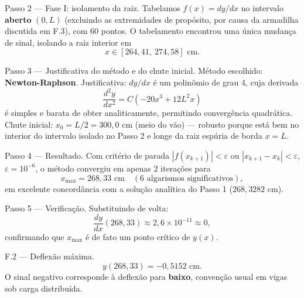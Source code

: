 \documentclass[
	12pt,				%
	openright,			%
	a4paper,			%
	english,			%
	french,				%
	spanish,			%
	brazil,				%
	]{abntex2}
\begin{document}
{Passo 2 --- Fase I: isolamento da raiz.}
Tabelamos $f(x)=dy/dx$ no intervalo \textbf{aberto} $(0,L)$ (excluindo as extremidades de propósito, por causa da armadilha discutida em F.3), com 60 pontos. O tabelamento encontrou uma única mudança de sinal, isolando a raiz interior em
\[
x \in [264{,}41,\ 274{,}58]\text{ cm}.
\]

{Passo 3 --- Justificativa do método e do chute inicial.}
Método escolhido: \textbf{Newton-Raphson}. Justificativa: $dy/dx$ é um polinômio de grau 4, cuja derivada
\[
\frac{d^2y}{dx^2} = C\left(-20x^3+12L^2x\right)
\]
é simples e barata de obter analiticamente, permitindo convergência quadrática. Chute inicial: $x_0=L/2=300{,}0$ cm (meio do vão) --- robusto porque está bem no interior do intervalo isolado no Passo 2 e longe da raiz espúria de borda $x=L$.

{Passo 4 --- Resultado.}
Com critério de parada $|f(x_{k+1})|<\varepsilon$ ou $|x_{k+1}-x_k|<\varepsilon$, $\varepsilon=10^{-6}$, o método convergiu em apenas $2$ iterações para
\[
x_{\text{max}} = 268{,}33\text{ cm} \quad (6\text{ algarismos significativos}),
\]
em excelente concordância com a solução analítica do Passo 1 ($268{,}3282$ cm).

{Passo 5 --- Verificação.}
Substituindo de volta:
\[
\frac{dy}{dx}(268{,}33) \approx 2{,}6\times10^{-11} \approx 0,
\]
confirmando que $x_{\text{max}}$ é de fato um ponto crítico de $y(x)$.

{F.2 --- Deflexão máxima.}
\[
y(268{,}33) = -0{,}5152\text{ cm}.
\]
O sinal negativo corresponde à deflexão para \textbf{baixo}, convenção usual em vigas sob carga distribuída.
\end{document}
